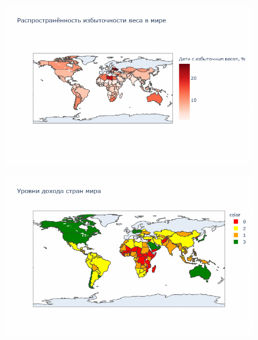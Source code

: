 \documentclass{beamer}
\begin{document}
\begin{frame}

\begin{figure}
	\centering
	\includegraphics[width=125mm]{14.png}
\end{figure}


\end{frame}


\begin{frame}

\begin{figure}
	\centering
	\includegraphics[width=120mm]{15.png}
\end{figure}


\end{frame}
\end{document}
